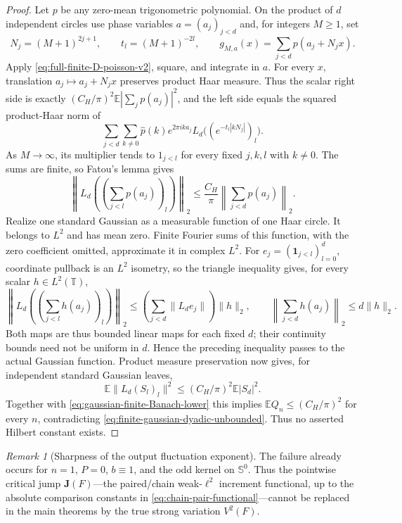 \documentclass[11pt]{article}
\numberwithin{equation}{section}
\theoremstyle{remark}
\newtheorem{remark}[theorem]{Remark}
\theoremstyle{definition}
\begin{document}
\begin{proof}
Let $p$ be any zero-mean trigonometric polynomial.  On the product of $d$
independent circles use phase variables $a=(a_j)_{j<d}$ and, for integers $M\ge1$, set
\[
 N_j=(M+1)^{2j+1},\qquad t_l=(M+1)^{-2l},\qquad
 g_{M,a}(x)=\sum_{j<d}p(a_j+N_jx).
\]
Apply \eqref{eq:full-finite-D-poisson-v2}, square, and
integrate in $a$.  For every $x$, translation
$a_j\mapsto a_j+N_jx$ preserves product Haar measure.  Thus the scalar
right side is exactly $(C_H/\pi)^2\mathbb E|\sum_jp(a_j)|^2$, and the
left side equals the squared product-Haar norm of
\[
 \sum_{j<d}\sum_{k\ne0}\widehat p(k)e^{2\pi ika_j}
 L_d\bigl((e^{-t_l|kN_j|})_l\bigr).
\]
As $M\to\infty$, its multiplier tends to $1_{j<l}$ for every fixed
$j,k,l$ with $k\ne0$.  The sums are finite, so Fatou's lemma gives
\[
 \left\|L_d\left(\left(\sum_{j<l}p(a_j)\right)_l\right)\right\|_2
 \le\frac{C_H}{\pi}\left\|\sum_{j<d}p(a_j)\right\|_2.
\]
Realize one standard Gaussian as a measurable function of one Haar
circle.  It belongs to $L^2$ and has mean zero.  Finite Fourier sums of this function,
with the zero coefficient omitted, approximate it in complex $L^2$.
For $e_j=(\mathbf1_{j<l})_{l=0}^d$, coordinate pullback is an $L^2$
isometry, so the triangle inequality gives, for every scalar $h\in L^2(\mathbb T)$,
\begin{equation}\label{eq:finite-D-L2-continuity}
 \left\|L_d\left(\left(\sum_{j<l}h(a_j)\right)_l\right)\right\|_2
 \le \left(\sum_{j<d}\|L_de_j\|\right)\|h\|_2,
 \qquad \left\|\sum_{j<d}h(a_j)\right\|_2\le d\|h\|_2.
\end{equation}
Both maps are thus bounded linear maps for each fixed $d$; their
continuity bounds need not be uniform in $d$.  Hence the preceding
inequality passes to the actual Gaussian function.  Product
measure preservation now gives, for independent standard Gaussian leaves,
\[
 \mathbb E\|L_d(S_l)_l\|^2
 \le (C_H/\pi)^2\mathbb E|S_d|^2.
\]
Together with \eqref{eq:gaussian-finite-Banach-lower} this implies
$\mathbb E Q_n\le(C_H/\pi)^2$ for every $n$, contradicting
\eqref{eq:finite-gaussian-dyadic-unbounded}.  Thus no asserted Hilbert
constant exists.
\end{proof}

\begin{remark}[Sharpness of the output fluctuation exponent]
The failure already occurs for $n=1$, $P=0$, $b\equiv1$, and the odd kernel
on $\mathbb S^0$.  Thus the pointwise critical jump $\mathbf J(F)$---the
paired/chain weak-$\ell^2$ increment functional, up to the absolute
comparison constants in \eqref{eq:chain-pair-functional}---cannot be
replaced in the main theorems by the true strong variation $V^2(F)$.
\end{remark}
\end{document}
